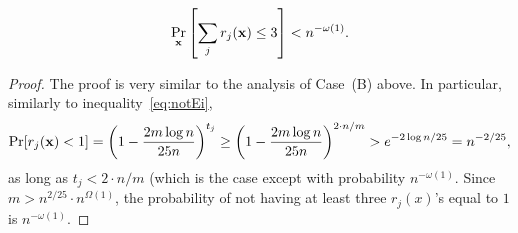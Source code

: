 \begin{claim}\label{cl:A-7}
\begin{equation}
\Pr_{{\bf x}} \left[\sum_j r_j({\bf x}) \le 3\right] < n^{-\omega(1)}.
\end{equation}
\end{claim}

\begin{proof}
	The proof is very similar to the analysis of Case~(B) above. In particular, similarly to inequality~\eqref{eq:notEi},
	$$
	\Pr[r_j({\bf x})<1] = \left( 1-\frac{2m \log n}{25 n} \right)^{t_j}
    \geq
	\left( 1-\frac{2m \log n}{25 n} \right)^{2 \cdot n/m} > e^{-2 \log n/25} = n^{-2/25},
	$$
	as long as $t_j < 2\cdot n/m$ (which is the case except with probability $n^{-\omega(1)}$. Since $m > n^{2/25} \cdot n^{\Omega(1)}$, the probability of not having at least three $r_j(x)$'s equal to $1$ is $n^{-\omega(1)}$.
\end{proof}












































































